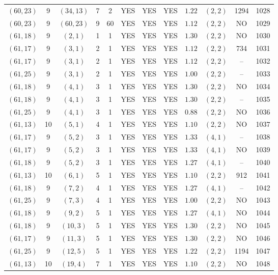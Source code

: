 \begin{longtable}{|c|c|c|c|c|c|c|c|c|c|c|c|}
$(60,23)$ & 9 & $(34,13)$ & 7 & 2 & YES & YES & YES & $1.22$ & $(2,2)$ & 1294 & 1028\\
$(60,23)$ & 9 & $(60,23)$ & 9 & 60 & YES & YES & YES & $1.12$ & $(2,2)$ & NO & 1029\\
$(61,18)$ & 9 & $(2,1)$ & 1 & 1 & YES & YES & YES & $1.30$ & $(2,2)$ & NO & 1030\\
$(61,17)$ & 9 & $(3,1)$ & 2 & 1 & YES & YES & YES & $1.12$ & $(2,2)$ & 734 & 1031\\
$(61,17)$ & 9 & $(3,1)$ & 2 & 1 & YES & YES & YES & $1.12$ & $(2,2)$ & -- & 1032\\
$(61,25)$ & 9 & $(3,1)$ & 2 & 1 & YES & YES & YES & $1.00$ & $(2,2)$ & -- & 1033\\
$(61,18)$ & 9 & $(4,1)$ & 3 & 1 & YES & YES & YES & $1.30$ & $(2,2)$ & NO & 1034\\
$(61,18)$ & 9 & $(4,1)$ & 3 & 1 & YES & YES & YES & $1.30$ & $(2,2)$ & -- & 1035\\
$(61,25)$ & 9 & $(4,1)$ & 3 & 1 & YES & YES & YES & $0.88$ & $(2,2)$ & NO & 1036\\
$(61,13)$ & 10 & $(5,1)$ & 4 & 1 & YES & YES & YES & $1.10$ & $(2,2)$ & NO & 1037\\
$(61,17)$ & 9 & $(5,2)$ & 3 & 1 & YES & YES & YES & $1.33$ & $(4,1)$ & -- & 1038\\
$(61,17)$ & 9 & $(5,2)$ & 3 & 1 & YES & YES & YES & $1.33$ & $(4,1)$ & NO & 1039\\
$(61,18)$ & 9 & $(5,2)$ & 3 & 1 & YES & YES & YES & $1.27$ & $(4,1)$ & -- & 1040\\
$(61,13)$ & 10 & $(6,1)$ & 5 & 1 & YES & YES & YES & $1.10$ & $(2,2)$ & 912 & 1041\\
$(61,18)$ & 9 & $(7,2)$ & 4 & 1 & YES & YES & YES & $1.27$ & $(4,1)$ & -- & 1042\\
$(61,25)$ & 9 & $(7,3)$ & 4 & 1 & YES & YES & YES & $1.00$ & $(2,2)$ & NO & 1043\\
$(61,18)$ & 9 & $(9,2)$ & 5 & 1 & YES & YES & YES & $1.27$ & $(4,1)$ & NO & 1044\\
$(61,18)$ & 9 & $(10,3)$ & 5 & 1 & YES & YES & YES & $1.30$ & $(2,2)$ & NO & 1045\\
$(61,17)$ & 9 & $(11,3)$ & 5 & 1 & YES & YES & YES & $1.30$ & $(2,2)$ & NO & 1046\\
$(61,25)$ & 9 & $(12,5)$ & 5 & 1 & YES & YES & YES & $1.22$ & $(2,2)$ & 1194 & 1047\\
$(61,13)$ & 10 & $(19,4)$ & 7 & 1 & YES & YES & YES & $1.10$ & $(2,2)$ & NO & 1048\\

\end{longtable}
